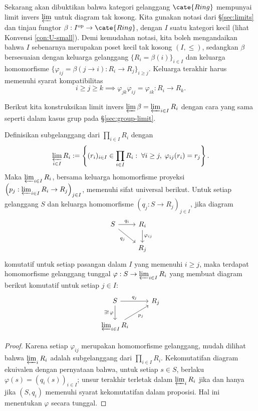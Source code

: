 Sekarang akan dibuktikan bahwa kategori gelanggang $\cate{Ring}$  mempunyai limit invers $\varprojlim$ untuk diagram tak kosong. Kita gunakan notasi dari \S\ref{sec:limits} dan tinjau fungtor $\beta: I^\text{op} \to \cate{Ring}$, dengan $I$ suatu kategori kecil (lihat Konvensi \ref{con:U-small}). Demi kemudahan notasi, kita boleh mengandaikan bahwa $I$ sebenarnya merupakan poset kecil tak kosong $(I, \leq)$, sedangkan $\beta$ bersesuaian dengan keluarga gelanggang $\{R_i = \beta(i) \}_{i \in I}$ dan keluarga homomorfisme $\{\varphi_{ij} = \beta(j \to i): R_i \to R_j \}_{i \geq j}$. Keluarga terakhir harus memenuhi syarat kompatibilitas
\[ i \geq j \geq k \implies \varphi_{jk} \varphi_{ij} = \varphi_{ik}: R_i \to R_k. \]

Berikut kita konstruksikan limit invers $\varprojlim \beta = \varprojlim_{i \in I} R_i$ dengan cara yang sama seperti dalam kasus grup pada \S\ref{sec:group-limit}.

\begin{proposition}
	Definisikan subgelanggang dari $\prod_{i \in I} R_i$ dengan
	\[ \varprojlim_{i \in I} R_i := \left\{ (r_i)_{i \in I} \in \prod_{i \in I} R_i : \; \forall i \geq j,\; \varphi_{ij}(r_i) = r_j \right\}. \]
	Maka $\varprojlim_{i \in I} R_i$, bersama keluarga homomorfisme proyeksi $\left( p_j: \varprojlim_{i \in I} R_i \to R_j \right)_{j \in I}$, memenuhi sifat universal berikut. Untuk setiap gelanggang $S$ dan keluarga homomorfisme $(q_j: S \to R_j)_{j \in I}$, jika diagram
	\[ \begin{tikzcd}
		S \arrow[r, "q_i"] \arrow[rd, "q_j"'] & R_i \arrow[d, "\varphi_{ij}"] \\
		&  R_j
	\end{tikzcd} \]
	komutatif untuk setiap pasangan dalam $I$ yang memenuhi $i \geq j$, maka terdapat homomorfisme gelanggang tunggal $\varphi: S \to \varprojlim_{i \in I} R_i$ yang membuat diagram berikut komutatif untuk setiap $j \in I$:
	\[ \begin{tikzcd}
		S \arrow[r, "q_j"] \arrow[d, "{\exists! \, \varphi}"'] & R_j \\
		\varprojlim_{i \in I} R_i \arrow[ru, "p_j"'] &
	\end{tikzcd} \]
\end{proposition}
\begin{proof}
	Karena setiap $\varphi_{ij}$ merupakan homomorfisme gelanggang, mudah dilihat bahwa $\varprojlim_i R_i$ adalah subgelanggang dari $\prod_{i \in I} R_i$. Kekomutatifan diagram ekuivalen dengan pernyataan bahwa, untuk setiap $s \in S$, berlaku $\varphi(s) = (q_i(s))_{i \in I}$; unsur terakhir terletak dalam $\varprojlim_i R_i$ jika dan hanya jika $(S, q_i)$ memenuhi syarat kekomutatifan dalam proposisi. Hal ini menentukan $\varphi$ secara tunggal.
\end{proof}

